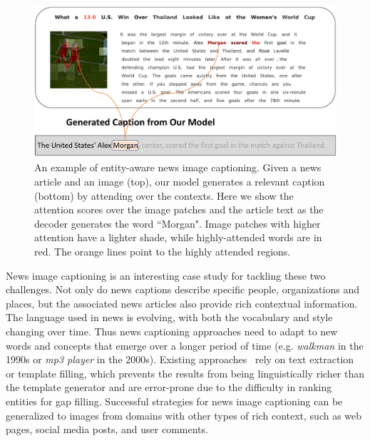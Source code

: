 \begin{figure}[t]
	\begin{center}
		\includegraphics[width=0.99\linewidth]{figures/figure_1.pdf}
	\end{center}
	\capmoveup
   \caption{An example of entity-aware news image captioning. Given a news
	 article and an image (top), our model generates a relevant caption
	 (bottom) by attending over the contexts. Here we show the attention scores
	 over the image patches and the article text as the decoder generates the
	 word ``Morgan". Image patches with higher attention have a lighter shade,
	 while highly-attended words are in red. The orange lines point to
	 the highly attended regions.}
	 \postfigmoveup
	\label{fig:teaser}
\end{figure}


News image captioning is an interesting case study for tackling these two
challenges. Not only do news captions describe specific people, organizations
and places, but the associated news articles also provide rich contextual
information. The language used in news is evolving, with both the vocabulary
and style changing over time. Thus news captioning approaches need to adapt to
new words and concepts that emerge over a longer period of time (e.g. {\em
walkman} in the 1990s or {\em mp3 player} in the 2000s). Existing
approaches~\cite{Tariq2017ACE,Ramisa2016BreakingNewsAA,Biten2019GoodNews} rely
on text extraction or template filling, which prevents the results from being
linguistically richer than the template generator and are error-prone due to
the difficulty in ranking entities for gap filling. Successful strategies for
news image captioning can be generalized to images from domains
with other types of rich context, such as
web pages, social media posts, and user
comments.

